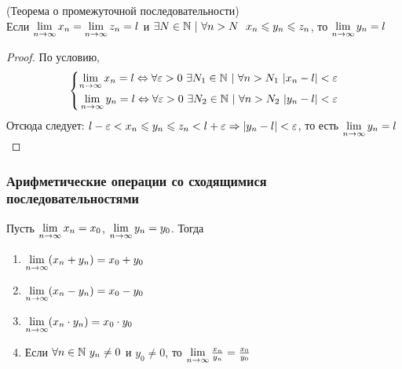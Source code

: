 \begin{theorem} (Теорема о промежуточной последовательности)\\
    Если $\lim\limits_{n \to \infty} x_n = \lim\limits_{n \to \infty} z_n = l$ и $\exists N \in \N\ |\ \forall n > N\ \ x_n \le y_n \le z_n$, то $\lim\limits_{n \to \infty} y_n = l$
\end{theorem}

\begin{proof}
    По условию,
    $$
        \left\{\begin{aligned}
        \lim\limits_{n \to \infty} x_n = l \Leftrightarrow \forall \varepsilon > 0\ \exists N_1 \in \mathbb{N}\ |\ \forall n > N_1\ |x_n - l| < \varepsilon
        \\
        \lim\limits_{n \to \infty} y_n = l \Leftrightarrow \forall \varepsilon > 0\ \exists N_2 \in \mathbb{N}\ |\ \forall n > N_2\ |y_n - l| < \varepsilon
        \end{aligned}\right.
    $$
    Отсюда следует: $l - \varepsilon < x_n \leqslant y_n \leqslant z_n < l + \varepsilon \Rightarrow |y_n - l| < \varepsilon$, то есть $\lim\limits_{n \to \infty} y_n = l$
\end{proof}

\subsubsection{Арифметические операции со сходящимися последовательностями}

Пусть $\lim\limits_{n \to \infty} x_n = x_0$, $\lim\limits_{n \to \infty} y_n = y_0$. Тогда

\begin{enumerate}
	\item $\lim\limits_{n \to \infty} (x_n + y_n) = x_0 + y_0$
	\item $\lim\limits_{n \to \infty} (x_n - y_n) = x_0 - y_0$
	\item $\lim\limits_{n \to \infty} (x_n \cdot y_n) = x_0 \cdot y_0$
	\item Если $\forall n \in \mathbb{N}\ y_n \neq 0$ и $y_0 \neq 0$, то $\lim\limits_{n \to \infty} \frac{x_n}{y_n} = \frac{x_0}{y_0}$
\end{enumerate}


